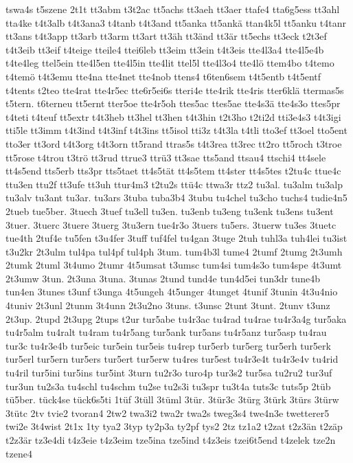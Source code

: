 {tswa4s
t5szene
2t1t
tt3abm
t3t2ac
tt5achs
tt3aeh
tt3aer
ttafe4
tta6g5ess
tt3ahl
tta4ke
t4t3alb
t4t3ana3
t4tanb
t4t3and
tt5anka
tt5ankä
ttan4k5l
tt5anku
t4tanr
tt3ans
t4t3app
tt3arb
tt3arm
tt3art
tt3äh
tt3änd
tt3är
tt5echs
tt3eck
t2t3ef
t4t3eib
tt3eif
t4teige
tteile4
ttei6leb
tt3eim
tt3ein
t4t3eis
tte4l3a4
tte4l5e4b
t4te4leg
ttel5ein
tte4l5en
tte4l5in
tte4lit
ttel5l
tte4l3o4
tte4lö
ttem4bo
t4temo
t4temö
t4t3emu
tte4na
tte4net
tte4nob
ttens4
t6ten6sem
t4t5entb
t4t5entf
t4tents
t2teo
tte4rat
tte4r5ec
tte6r5ei6s
tteri4e
tte4rik
tte4ris
tter6klä
ttermas5s
t5tern.
t6terneu
tt5ernt
tter5oe
tte4r5oh
ttes5ac
ttes5ae
tte4s3ä
tte4s3o
ttes5pr
t4teti
t4teuf
tt5extr
t4t3heb
tt3hel
tt3hen
t4t3hin
t2t3ho
t2ti2d
tti3e4s3
t4t3igi
tti5le
tt3imm
t4t3ind
t4t3inf
t4t3ins
tt5isol
tti3z
t4t3la
t4tli
tto3ef
tt3oel
tto5ent
tto3er
tt3ord
t4t3org
t4t3orn
tt5rand
ttras5s
t4t3rea
tt3rec
tt2ro
tt5roch
t3troe
tt5rose
t4trou
t3trö
tt3rud
ttrue3
ttrü3
tt3sae
tts5and
ttsau4
ttschi4
tt4sele
tt4s5end
tts5erb
tts3pr
tts5taet
tt4s5tät
tt4s5tem
tt4ster
tt4s5tes
t2tu4c
ttue4c
ttu3en
ttu2f
tt3ufe
tt3uh
ttur4m3
t2tu2s
ttü4c
ttwa3r
ttz2
tu3al.
tu3alm
tu3alp
tu3alv
tu3ant
tu3ar.
tu3ars
3tuba
tuba3b4
3tubu
tu4chel
tu3cho
tuchs4
tudie4n5
2tueb
tue5ber.
3tuech
3tuef
tu3ell
tu3en.
tu3enb
tu3eng
tu3enk
tu3ens
tu3ent
3tuer.
3tuerc
3tuere
3tuerg
3tu3ern
tue4r3o
3tuers
tu5ers.
3tuerw
tu3es
3tuetc
tue4th
2tuf4e
tu5fen
t3u4fer
3tuff
tuf4fel
tu4gan
3tuge
2tuh
tuhl3a
tuh4lei
tu3ist
t3u2kr
2t3ulm
tul4pa
tul4pf
tul4ph
3tum.
tum4b3l
tume4
2tumf
2tumg
2t3umh
2tumk
2tuml
3t4umo
2tumr
4t5umsat
t3umsc
tum4si
tum4s3o
tum4spe
4t3umt
2t3umw
3tun.
2t3una
3tuna.
3tunas
2tund
tund4e
tun4d5ei
tun3dr
tune4b
tun4en
3tunes
t3unf
t3unga
4t5ungeh
4t5unger
4tunget
4tunif
3tunin
4t3u4nio
4tuniv
2t3unl
2tunm
3t4unn
2t3u2no
3tuns.
t3unsc
2tunt
3tunt.
2tunv
t3unz
2t3up.
2tupd
2t3upg
2tups
t2ur
tur5abe
tu4r3ac
tu4rad
tu4rae
tu4r3a4g
tur5aka
tu4r5alm
tu4ralt
tu4ram
tu4r5ang
tur5ank
tur5ans
tu4r5anz
tur5asp
tu4rau
tur3c
tu4r3e4b
tur5eic
tur5ein
tur5eis
tu4rep
tur5erb
tur5erg
tur5erh
tur5erk
tur5erl
tur5ern
tur5ers
tur5ert
tur5erw
tu4res
tur5est
tu4r3e4t
tu4r3e4v
tu4rid
tu4ril
tur5ini
tur5ins
tur5int
3turn
tu2r3o
turo4p
tur3s2
tur5sa
tu2ru2
tur3uf
tur3un
tu2s3a
tu4schl
tu4schm
tu2se
tu2s3i
tu3spr
tu3t4a
tuts3c
tuts5p
2tüb
tü5ber.
tück4se
tück6s5ti
1tüf
3tüll
3tüml
3tür.
3tür3c
3türg
3türk
3türs
3türw
3tütc
2tv
tvie2
tvoran4
2tw2
twa3i2
twa2r
twa2s
tweg3s4
twe4n3e
twetterer5
twi2e
3t4wist
2t1x
1ty
tya2
3typ
ty2p3a
ty2pf
tys2
2tz
tz1a2
t2zat
t2z3än
t2zäp
t2z3är
tz3e4di
t4z3eie
t4z3eim
tze5ina
tze5ind
t4z3eis
tzei6t5end
t4zelek
tze2n
tzene4
}
